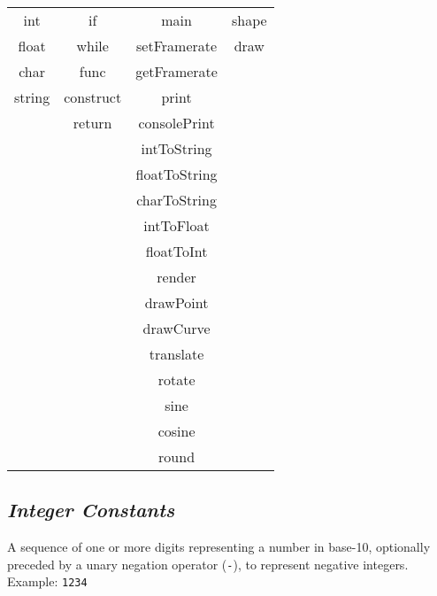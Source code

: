         \begin{center}
            \begin{tabular}{ |c|c|c|c| } 
            \hline
                int     & if            & main          & shape   \\ 
                float   & while         & setFramerate  & draw	  \\ 
                char    & func          & getFramerate  & \\
                string  & construct     & print         & \\
                        & return        & consolePrint  & \\
                        &               & intToString   & \\
                        &               & floatToString & \\
                        &               & charToString  & \\
                        &               & intToFloat    & \\
                        &               & floatToInt    & \\
                        &               & render        & \\
                        &               & drawPoint     & \\
                        &               & drawCurve     & \\
                        &               & translate     & \\
                        &               & rotate        & \\
                        &               & sine			& \\
                        &               & cosine		& \\
                        &               & round			& \\

            \hline
            \end{tabular}
        \end{center}

    \subsection{\textit{Integer Constants}}
    A sequence of one or more digits representing a number in base-10, optionally preceded by a unary negation operator (\texttt{-}), to represent negative integers.\\
    Example: \texttt{1234}

